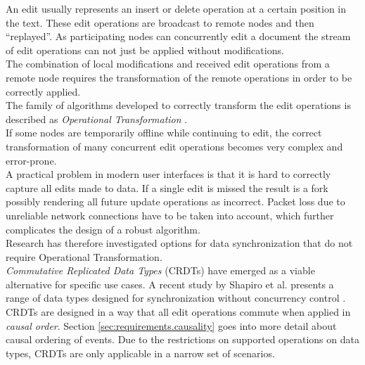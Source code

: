 An edit usually represents an insert or delete operation at a certain position in the text.
These edit operations are broadcast to remote nodes and then ``replayed''.
As participating nodes can concurrently edit a document the stream of edit operations can not just be applied without modifications.\\
The combination of local modifications and received edit operations from a remote node requires the transformation of the remote operations in order to be correctly applied.\\
The family of algorithms developed to correctly transform the edit operations is described as \emph{Operational Transformation} \cite{Ellis:1998vf}.\\
If some nodes are temporarily offline while continuing to edit, the correct transformation of many concurrent edit operations becomes very complex and error-prone.\\
A practical problem in modern user interfaces is that it is hard to correctly capture all edits made to data.
If a single edit is missed the result is a fork possibly rendering all future update operations as incorrect.
Packet loss due to unreliable network connections have to be taken into account, which further complicates the design of a robust algorithm.\\
Research has therefore investigated options for data synchronization that do not require Operational Transformation.\\

\emph{Commutative Replicated Data Types} (CRDTs) have emerged as a viable alternative for specific use cases.
A recent study by Shapiro et al. presents a range of data types designed for synchronization without concurrency control \cite{Shapiro:2011wy}.\\
CRDTs are designed in a way that all edit operations commute when applied in \emph{causal order}.
Section \ref{sec:requirements.causality} goes into more detail about causal ordering of events.
Due to the restrictions on supported operations on data types, CRDTs are only applicable in a narrow set of scenarios.

